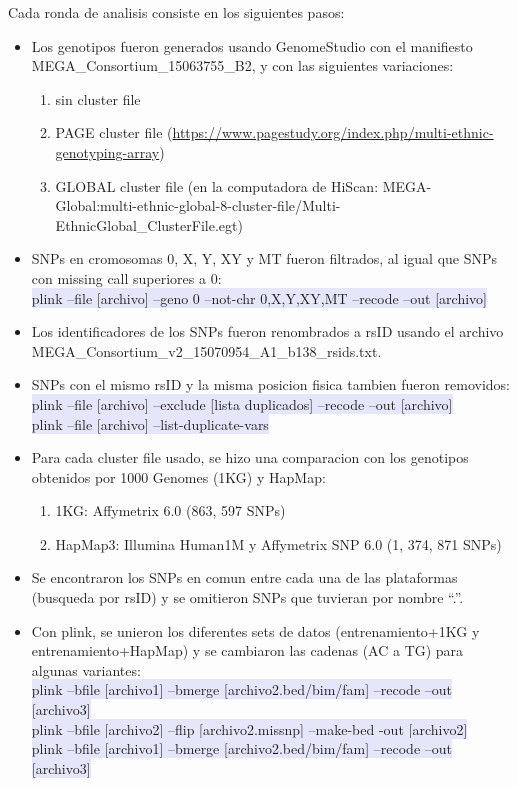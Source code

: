 \documentclass[11pt]{report}
\begin{document}
Cada ronda de analisis consiste en los siguientes pasos: 
\begin{itemize}
\item Los genotipos fueron generados usando GenomeStudio con el manifiesto 
MEGA\_Consortium\_15063755\_B2, y con las siguientes variaciones:
\begin{enumerate}
\item sin cluster file
\item PAGE cluster file (\url{https://www.pagestudy.org/index.php/multi-ethnic-genotyping-array})
\item GLOBAL cluster file (en la computadora de HiScan: MEGA-Global:multi-ethnic-global-8-cluster-file/Multi-EthnicGlobal\_ClusterFile.egt)
\end{enumerate}

\item SNPs en cromosomas 0, X, Y, XY y MT fueron filtrados, al igual que SNPs con missing call superiores a 0:\\
\colorbox{Lavender}{plink --file [archivo] --geno 0 --not-chr 0,X,Y,XY,MT --recode --out [archivo]}

\item Los identificadores de los SNPs fueron renombrados a rsID usando el archivo
\\ MEGA\_Consortium\_v2\_15070954\_A1\_b138\_rsids.txt.

\item SNPs con el mismo rsID y la misma posicion fisica tambien fueron removidos:\\
\colorbox{Lavender}{plink --file [archivo] --exclude [lista duplicados] --recode --out [archivo]}\\
\colorbox{Lavender}{plink --file [archivo] --list-duplicate-vars}

\item Para cada cluster file usado, se hizo una comparacion con los genotipos obtenidos por 1000 Genomes (1KG) y HapMap:
\begin{enumerate}
\item 1KG: Affymetrix 6.0 (863, 597 SNPs)
\item HapMap3: Illumina Human1M y Affymetrix SNP 6.0 (1, 374, 871 SNPs)
\end{enumerate}

\item Se encontraron los SNPs en comun entre cada una de las plataformas (busqueda por rsID) y se omitieron SNPs que  tuvieran por nombre ``.''.

\item Con plink, se unieron los diferentes sets de datos (entrenamiento+1KG y entrenamiento+HapMap) y se cambiaron las cadenas (AC a TG) para algunas variantes: \\
\colorbox{Lavender}{plink --bfile [archivo1] --bmerge [archivo2.bed/bim/fam] --recode --out [archivo3]}\\
\colorbox{Lavender}{plink --bfile [archivo2] --flip [archivo2.missnp] --make-bed -out [archivo2]}\\
\colorbox{Lavender}{plink --bfile [archivo1] --bmerge [archivo2.bed/bim/fam] --recode --out [archivo3]}


\end{itemize}
\end{document}
